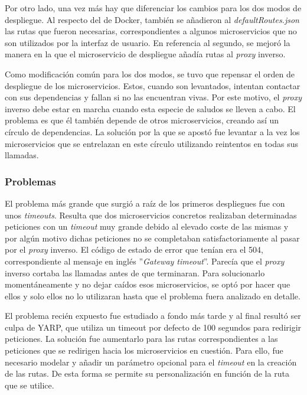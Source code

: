 \documentclass[11pt,spanish,listoffigures]{tfgetsinf}
\begin{document}
Por otro lado, una vez más hay que diferenciar los cambios para los dos modos de despliegue. Al respecto del de Docker, también se añadieron al \emph{defaultRoutes.json} las rutas que fueron necesarias, correspondientes a algunos microservicios que no son utilizados por la interfaz de usuario. En referencia al segundo, se mejoró la manera en la que el microservicio de despliegue añadía rutas al \emph{proxy} inverso.

Como modificación común para los dos modos, se tuvo que repensar el orden de despliegue de los microservicios. Estos, cuando son levantados, intentan contactar con sus dependencias y fallan si no las encuentran vivas. Por este motivo, el \emph{proxy} inverso debe estar en marcha cuando esta especie de saludos se lleven a cabo. El problema es que él también depende de otros microservicios, creando así un círculo de dependencias. La solución por la que se apostó fue levantar a la vez los microservicios que se entrelazan en este círculo utilizando reintentos en todas sus llamadas.


			\subsubsection{Problemas}

El problema más grande que surgió a raíz de los primeros despliegues fue con unos \emph{timeouts}. Resulta que dos microservicios concretos realizaban determinadas peticiones con un \emph{timeout} muy grande debido al elevado coste de las mismas y por algún motivo dichas peticiones no se completaban satisfactoriamente al pasar por el \emph{proxy} inverso. El código de estado de error que tenían era el 504, correspondiente al mensaje en inglés ''\emph{Gateway timeout}''. Parecía que el \emph{proxy} inverso cortaba las llamadas antes de que terminaran. Para solucionarlo momentáneamente y no dejar caídos esos microservicios, se optó por hacer que ellos y solo ellos no lo utilizaran hasta que el problema fuera analizado en detalle.

El problema recién expuesto fue estudiado a fondo más tarde y al final resultó ser culpa de YARP, que utiliza un timeout por defecto de 100 segundos para redirigir peticiones. La solución fue aumentarlo para las rutas correspondientes a las peticiones que se redirigen hacia los microservicios en cuestión. Para ello, fue necesario modelar y añadir un parámetro opcional para el \emph{timeout} en la creación de las rutas. De esta forma se permite su personalización en función de la ruta que se utilice.
\end{document}
